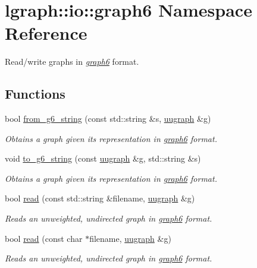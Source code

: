 \hypertarget{namespacelgraph_1_1io_1_1graph6}{}\section{lgraph\+:\+:io\+:\+:graph6 Namespace Reference}
\label{namespacelgraph_1_1io_1_1graph6}


Read/write graphs in {\itshape \hyperlink{namespacelgraph_1_1io_1_1graph6}{graph6}} format.  


\subsection*{Functions}
\begin{DoxyCompactItemize}
\item 
bool \hyperlink{namespacelgraph_1_1io_1_1graph6_aa0785d218fed2cfc2056c3ae4b1bdc84}{from\+\_\+g6\+\_\+string} (const std\+::string \&s, \hyperlink{classlgraph_1_1uugraph}{uugraph} \&g)
\begin{DoxyCompactList}\small\item\em Obtains a graph given its representation in {\itshape \hyperlink{namespacelgraph_1_1io_1_1graph6}{graph6}} format. \end{DoxyCompactList}\item 
void \hyperlink{namespacelgraph_1_1io_1_1graph6_a89dba61410e4fe01ab54b0a8e476942e}{to\+\_\+g6\+\_\+string} (const \hyperlink{classlgraph_1_1uugraph}{uugraph} \&g, std\+::string \&s)
\begin{DoxyCompactList}\small\item\em Obtains a graph given its representation in {\itshape \hyperlink{namespacelgraph_1_1io_1_1graph6}{graph6}} format. \end{DoxyCompactList}\item 
bool \hyperlink{namespacelgraph_1_1io_1_1graph6_acf631cd214582c5fb67d4766bc3f1270}{read} (const std\+::string \&filename, \hyperlink{classlgraph_1_1uugraph}{uugraph} \&g)
\begin{DoxyCompactList}\small\item\em Reads an unweighted, undirected graph in {\itshape \hyperlink{namespacelgraph_1_1io_1_1graph6}{graph6}} format. \end{DoxyCompactList}\item 
bool \hyperlink{namespacelgraph_1_1io_1_1graph6_a4100b07dc643c2fda1dd4cd2deb80a59}{read} (const char $\ast$filename, \hyperlink{classlgraph_1_1uugraph}{uugraph} \&g)
\begin{DoxyCompactList}\small\item\em Reads an unweighted, undirected graph in {\itshape \hyperlink{namespacelgraph_1_1io_1_1graph6}{graph6}} format. \end{DoxyCompactList}\item 

\end{DoxyCompactItemize}
